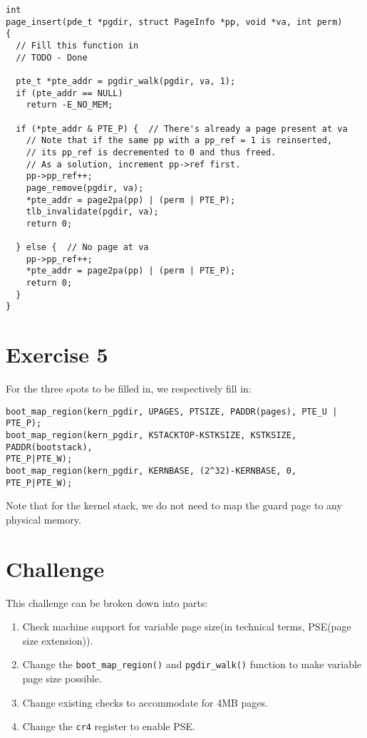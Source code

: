 \documentclass[]{article}
\begin{document}
\begin{verbatim}
int
page_insert(pde_t *pgdir, struct PageInfo *pp, void *va, int perm)
{
  // Fill this function in
  // TODO - Done
  
  pte_t *pte_addr = pgdir_walk(pgdir, va, 1);
  if (pte_addr == NULL)
    return -E_NO_MEM;

  if (*pte_addr & PTE_P) {	// There's already a page present at va
    // Note that if the same pp with a pp_ref = 1 is reinserted,
    // its pp_ref is decremented to 0 and thus freed.
    // As a solution, increment pp->ref first.
    pp->pp_ref++;
    page_remove(pgdir, va);
    *pte_addr = page2pa(pp) | (perm | PTE_P);
    tlb_invalidate(pgdir, va);
    return 0;

  } else {	// No page at va
    pp->pp_ref++;
    *pte_addr = page2pa(pp) | (perm | PTE_P);
    return 0;
  }
}
\end{verbatim}

\section*{Exercise 5}

For the three spots to be filled in, we respectively fill in:

\begin{verbatim}
boot_map_region(kern_pgdir, UPAGES, PTSIZE, PADDR(pages), PTE_U | PTE_P);
boot_map_region(kern_pgdir, KSTACKTOP-KSTKSIZE, KSTKSIZE, PADDR(bootstack), 
PTE_P|PTE_W);
boot_map_region(kern_pgdir, KERNBASE, (2^32)-KERNBASE, 0, PTE_P|PTE_W);
\end{verbatim}

Note that for the kernel stack, we do not need to map the guard page to any physical memory.

\section*{Challenge}
This challenge can be broken down into parts:
\begin{enumerate}
  \item Check machine support for variable page size(in technical terms, PSE(page size extension)).
  \item Change the \verb|boot_map_region()| and \verb|pgdir_walk()| function to make variable page size possible.
  \item Change existing checks to accommodate for 4MB pages.
  \item Change the \verb|cr4| register to enable PSE.
\end{enumerate}
\end{document}
